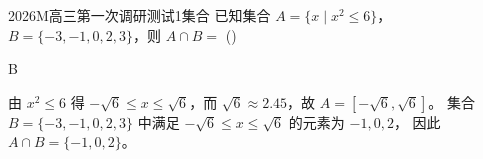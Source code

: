 
\begin{problem}{2026}{M}{高三第一次调研测试}{1}{集合}
已知集合 $A=\{x\mid x^2\leq6\}$，$B=\{-3,-1,0,2,3\}$，则 $A\cap B=$ (\hspace{1cm})
\begin{choices}
\end{choices}
\end{problem}

\begin{answer}
B
\end{answer}

\begin{solutions}
由 $x^2\leq6$ 得 $-\sqrt{6}\leq x\leq\sqrt{6}$，而 $\sqrt{6}\approx2.45$，故 $A=[-\sqrt{6},\sqrt{6}]$。  
集合 $B=\{-3,-1,0,2,3\}$ 中满足 $-\sqrt{6}\leq x\leq\sqrt{6}$ 的元素为 $-1,0,2$，  
因此 $A\cap B=\{-1,0,2\}$。
\end{solutions}